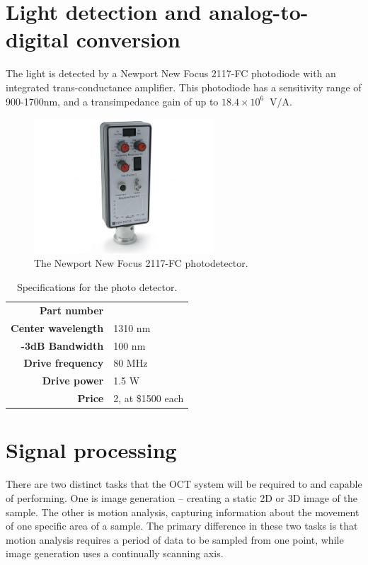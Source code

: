 \section{Light detection and analog-to-digital conversion}

The light is detected by a Newport New Focus 2117-FC photodiode with an integrated trans-conductance amplifier. This photodiode has a sensitivity range of 900-1700nm, and a transimpedance gain of up to $18.4 \times 10^6 \;\; \mathrm{V}/\mathrm{A}$.

\begin{figure}[h!]

\centering
\includegraphics[width=0.6\textwidth]{Images/System/pd.jpg}
\caption{The Newport New Focus 2117-FC photodetector.}
\end{figure}

\begin{table}[h!]
\centering
\begin{tabular}{ >{\bf}r | l}
Part number & \\
Center wavelength & 1310 nm \\
-3dB Bandwidth & 100 nm \\
Drive frequency & 80 MHz \\
Drive power & 1.5 W \\
Price & 2, at \$1500 each \\
\end{tabular}
\caption{Specifications for the photo detector.}
\end{table} 

\section{Signal processing}
\label{sec:sig_proc}

There are two distinct tasks that the OCT system will be required to and capable of performing. One is image generation -- creating a static 2D or 3D image of the sample. The other is motion analysis, capturing information about the movement of one specific area of a sample. The primary difference in these two tasks is that motion analysis requires a period of data to be sampled from one point, while image generation uses a continually scanning axis.

